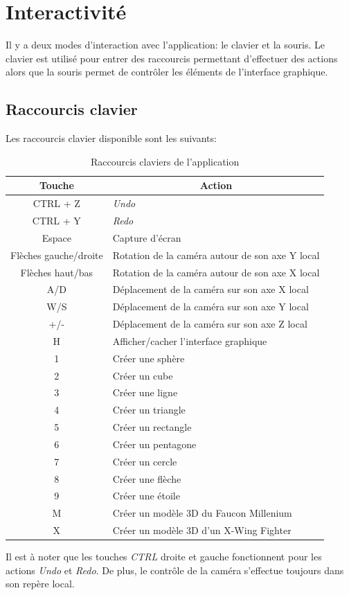 \section{Interactivité}
\label{s:interactivité}

Il y a deux modes d'interaction avec l'application: le clavier et la souris.
Le clavier est utilisé pour entrer des raccourcis permettant d'effectuer des actions alors que la souris permet de contrôler les éléments de l'interface graphique.

\subsection{Raccourcis clavier}
Les raccourcis clavier disponible sont les suivants:

\begin{table}[h]
    \begin{center}
    \begin{tabular}{|c|l|}
        \hline
        \multicolumn{1}{|c|}{Touche} & \multicolumn{1}{c|}{Action}\\
        \hline
        CTRL + Z & \emph{Undo}\\
        CTRL + Y & \emph{Redo}\\
        Espace & Capture d'écran\\  
        Flèches gauche/droite & Rotation de la caméra autour de son axe Y local\\
        Flèches haut/bas & Rotation de la caméra autour de son axe X local\\
        A/D & Déplacement de la caméra sur son axe X local\\
        W/S & Déplacement de la caméra sur son axe Y local\\
        +/- & Déplacement de la caméra sur son axe Z local\\
        H & Afficher/cacher l'interface graphique\\
        1 & Créer une sphère\\
        2 & Créer un cube\\
        3 & Créer une ligne\\
        4 & Créer un triangle\\
        5 & Créer un rectangle\\
        6 & Créer un pentagone\\
        7 & Créer un cercle\\
        8 & Créer une flèche\\
        9 & Créer une étoile\\
        M & Créer un modèle 3D du Faucon Millenium\\
        X & Créer un modèle 3D d'un X-Wing Fighter\\
        \hline
    \end{tabular}
    \caption{Raccourcis claviers de l'application}
    \end{center}
\end{table}
Il est à noter que les touches \emph{CTRL} droite et gauche fonctionnent pour les actions \emph{Undo} et \emph{Redo}.
De plus, le contrôle de la caméra s'effectue toujours dans son repère local.\\

